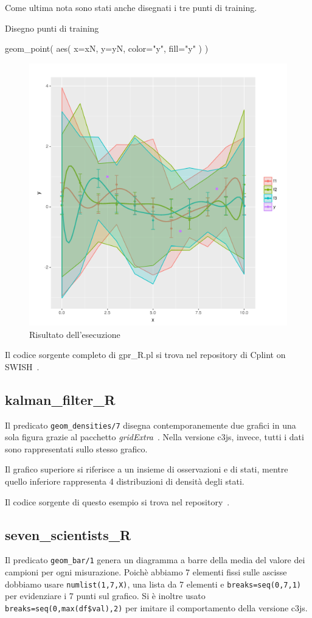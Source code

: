 \documentclass[10pt,titlepage,twoside,a4paper]{report}
\newenvironment{code}{\singlespacing\captionsetup{type=listing}}{}
\begin{document}
Come ultima nota sono stati anche disegnati i tre punti di training.
\begin{code}
\caption{Disegno punti di training}
\begin{rcode*}{}
geom_point(
    aes(
        x=xN,
        y=yN,
        color="y",
        fill="y"
    )
)
\end{rcode*}
\end{code}

\begin{figure}[H]
\centering
\caption{Risultato dell'esecuzione}
\includegraphics[width=.5\linewidth]{gpr_R_plot.png}
\end{figure}

Il codice sorgente completo di gpr\_R.pl si trova nel repository di 
Cplint on SWISH~\cite{gprRpl}.

\subsection{kalman\_filter\_R}
Il predicato \texttt{geom\_densities/7} disegna contemporanemente
due grafici in una sola figura grazie al pacchetto
\emph{gridExtra}~\cite{gridExtra}. Nella versione c3js, invece, tutti i dati 
sono rappresentati sullo stesso grafico.

Il grafico superiore si riferisce a un insieme di osservazioni e di stati, 
mentre quello inferiore rappresenta 4  distribuzioni di densità degli stati.

Il codice sorgente di questo esempio si trova nel repository~\cite{kalmanFilterRpl}.

\subsection{seven\_scientists\_R}
Il predicato \texttt{geom\_bar/1}  genera un diagramma a barre 
della media del valore dei campioni per ogni misurazione. Poichè 
abbiamo 7 elementi fissi sulle ascisse dobbiamo usare \texttt{numlist(1,7,X)}, 
una lista da 7 elementi e \texttt{breaks=seq(0,7,1)} per evidenziare i 7 
punti sul grafico. Si è inoltre usato \texttt{breaks=seq(0,max(df\$val),2)} 
per imitare il comportamento della versione c3js.
\end{document}
